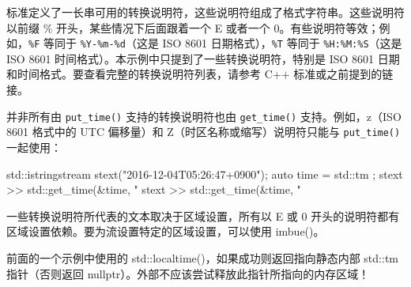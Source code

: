 标准定义了一长串可用的转换说明符，这些说明符组成了格式字符串。这些说明符以前缀 \% 开头，某些情况下后面跟着一个 E 或者一个 0。有些说明符等效；例如，\verb|%F| 等同于 \verb|%Y-%m-%d|（这是 ISO 8601 日期格式），\verb|%T| 等同于 \verb|%H:%M:%S|（这是 ISO 8601 时间格式）。本示例中只提到了一些转换说明符，特别是 ISO 8601 日期和时间格式。要查看完整的转换说明符列表，请参考 C++ 标准或之前提到的链接。

\begin{myNotic}
并非所有由 \verb|put_time()| 支持的转换说明符也由 \verb|get_time()| 支持。例如，z（ISO 8601 格式中的 UTC 偏移量）和 Z（时区名称或缩写）说明符只能与 \verb|put_time()| 一起使用：

\begin{cpp}
std::istringstream stext("2016-12-04T05:26:47+0900");
auto time = std::tm {};
stext >> std::get_time(&time, "%
stext >> std::get_time(&time, "%
\end{cpp}
\end{myNotic}

一些转换说明符所代表的文本取决于区域设置，所有以 E 或 0 开头的说明符都有区域设置依赖。要为流设置特定的区域设置，可以使用 imbue()。

\begin{myNotic}
前面的一个示例中使用的 std::localtime()，如果成功则返回指向静态内部 std::tm 指针（否则返回 nullptr）。外部不应该尝试释放此指针所指向的内存区域！
\end{myNotic}

